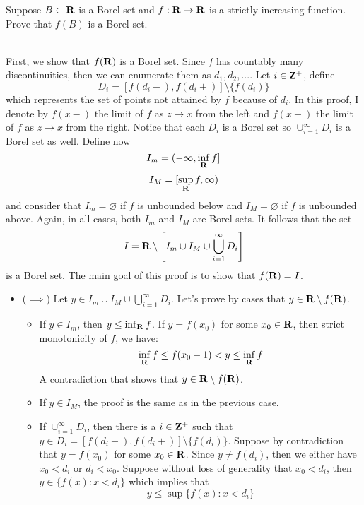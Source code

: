 \begin{exercise}
    Suppose $B \subset \mathbf{R}$ is a Borel set and $f : \mathbf{R} \to \mathbf{R}$ is a strictly increasing function. Prove that $f(B)$ is a Borel set. \\
\end{exercise}

\begin{solution}
    \\ First, we show that $f(\mathbf{R})$ is a Borel set. Since $f$ has countably many discontinuities, then we can enumerate them as $d_1, d_2, ...$. Let $i \in \mathbf{Z}^+$, define 
    $$D_i = [f(d_i -), f(d_i + )] \setminus \{f(d_i)\}$$
    which represents the set of points not attained by $f$ because of $d_i$. In this proof, I denote by $f(x-)$ the limit of $f$ as $z \rightarrow x$ from the left and $f(x+)$ the limit of $f$ as $z \rightarrow x$ from the right. Notice that each $D_i$ is a Borel set so $\cup_{i=1}^{\infty}D_i$ is a Borel set as well. Define now
    $$I_m = (-\infty, \inf_{\mathbf{R}}f]$$
    $$I_M = [\sup_{\mathbf{R}}f, \infty)$$
    and consider that $I_m = \varnothing$ if $f$ is unbounded below and $I_M = \varnothing$ if $f$ is unbounded above. Again, in all cases, both $I_m$ and $I_M$ are Borel sets. It follows that the set
    $$I = \mathbf{R} \setminus \left[I_m \cup I_M \cup \bigcup_{i=1}^{\infty}D_i\right]$$
    is a Borel set. The main goal of this proof is to show that $f(\mathbf{R}) = I$.
    \begin{itemize}
        \item ($\implies$) Let $y \in I_m \cup I_M \cup \bigcup_{i=1}^{\infty}D_i$. Let's prove by cases that $y \in \mathbf{R} \setminus f(\mathbf{R})$.
        \begin{itemize}
            \item If $y \in I_m$, then $y \leq \inf_{\mathbf{R}}f$. If $y = f(x_0)$ for some $x_0 \in \mathbf{R}$, then strict monotonicity of $f$, we have:
            $$\inf_{\mathbf{R}}f \leq f(x_0 - 1) < y \leq \inf_{\mathbf{R}}f$$
            A contradiction that shows that $y \in \mathbf{R} \setminus f(\mathbf{R})$.
            \item If $y \in I_M$, the proof is the same as in the previous case.
            \item If $\cup_{i=1}^{\infty}D_i$, then there is a $i \in \mathbf{Z}^+$ such that $y \in D_i = [f(d_i -), f(d_i + )] \setminus \{f(d_i)\}$. Suppose by contradiction that $y = f(x_0)$ for some $x_0 \in \mathbf{R}$. Since $y \neq f(d_i)$, then we either have $x_0 < d_i$ or $d_i < x_0$. Suppose without loss of generality that $x_0 < d_i$, then $y \in \{f(x) : x < d_i\}$ which implies that
            $$y \leq \sup \{f(x) : x < d_i\}$$

\end{itemize}
\end{itemize}
\end{solution}
